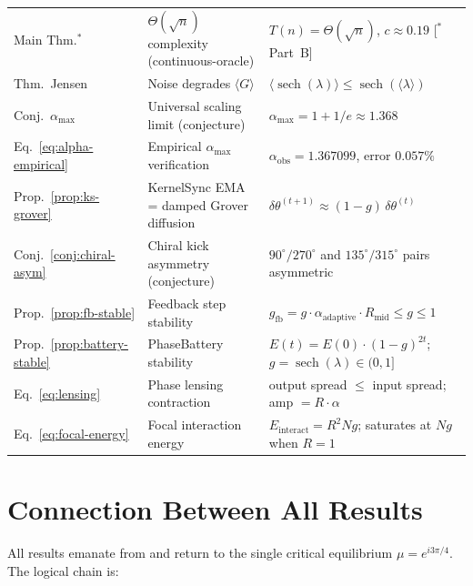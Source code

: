 \documentclass[12pt,a4paper]{article}
\theoremstyle{plain}
\theoremstyle{definition}
\theoremstyle{remark}
\begin{document}
\begin{center}
\begin{tabular}{@{}lll@{}}
Main Thm.$^*$
  & $\Theta(\sqrt n)$ complexity (continuous-oracle)
  & $T(n)=\Theta(\sqrt n)$, $c\approx 0.19$ [$^*$Part~B]\\
Thm.\ Jensen
  & Noise degrades $\langle G\rangle$
  & $\langle\operatorname{sech}(\lambda)\rangle\le\operatorname{sech}(\langle\lambda\rangle)$\\
Conj.\ $\alpha_{\max}$
  & Universal scaling limit (conjecture)
  & $\alpha_{\max}=1+1/e\approx 1.368$\\
Eq.~\eqref{eq:alpha-empirical}
  & Empirical $\alpha_{\max}$ verification
  & $\alpha_{\mathrm{obs}}=1.367099$, error $0.057\%$\\
Prop.~\ref{prop:ks-grover}
  & KernelSync EMA = damped Grover diffusion
  & $\delta\theta^{(t+1)}\approx(1-g)\,\delta\theta^{(t)}$\\
Conj.~\ref{conj:chiral-asym}
  & Chiral kick asymmetry (conjecture)
  & $90^\circ/270^\circ$ and $135^\circ/315^\circ$ pairs asymmetric\\
Prop.~\ref{prop:fb-stable}
  & Feedback step stability
  & $g_{\mathrm{fb}}=g\cdot\alpha_{\mathrm{adaptive}}\cdot R_{\mathrm{mid}}\le g\le 1$\\
Prop.~\ref{prop:battery-stable}
  & PhaseBattery stability
  & $E(t)=E(0)\cdot(1-g)^{2t}$; $g=\operatorname{sech}(\lambda)\in(0,1]$\\
Eq.~\eqref{eq:lensing}
  & Phase lensing contraction
  & output spread $\le$ input spread; amp $= R\cdot\alpha$\\
Eq.~\eqref{eq:focal-energy}
  & Focal interaction energy
  & $E_{\mathrm{interact}}=R^2 N g$; saturates at $Ng$ when $R=1$\\
\bottomrule
\end{tabular}
\end{center}

\section{Connection Between All Results}
\label{sec:connection}

All results emanate from and return to the single critical equilibrium
$\mu = e^{i3\pi/4}$.  The logical chain is:
\end{document}
